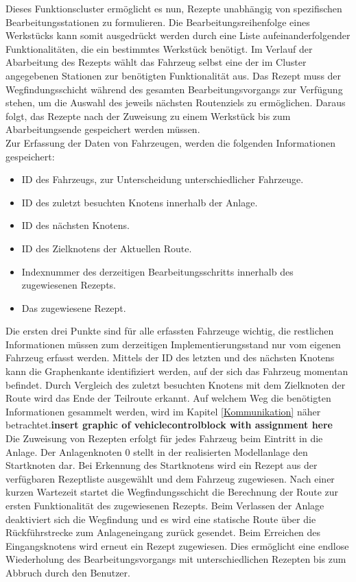 			Dieses Funktionscluster ermöglicht es nun, Rezepte unabhängig von spezifischen Bearbeitungsstationen zu formulieren. Die Bearbeitungsreihenfolge eines Werkstücks kann somit ausgedrückt werden durch eine Liste aufeinanderfolgender Funktionalitäten, die ein bestimmtes Werkstück benötigt. Im Verlauf der Abarbeitung des Rezepts wählt das Fahrzeug selbst eine der im Cluster angegebenen Stationen zur benötigten Funktionalität aus. Das Rezept muss der Wegfindungsschicht während des gesamten Bearbeitungsvorgangs zur Verfügung stehen, um die Auswahl des jeweils nächsten Routenziels zu ermöglichen. Daraus folgt, das Rezepte nach der Zuweisung zu einem Werkstück bis zum Abarbeitungsende gespeichert werden müssen.\\
			
			Zur Erfassung der Daten von Fahrzeugen, werden die folgenden Informationen gespeichert:
			
			\begin{itemize}
				\item ID des Fahrzeugs, zur Unterscheidung unterschiedlicher Fahrzeuge.
				\item ID des zuletzt besuchten Knotens innerhalb der Anlage.
				\item ID des nächsten Knotens. 
				\item ID des Zielknotens der Aktuellen Route.
				\item Indexnummer des derzeitigen Bearbeitungsschritts innerhalb des zugewiesenen Rezepts.
				\item Das zugewiesene Rezept.
			\end{itemize} 
			
			Die ersten drei Punkte sind für alle erfassten Fahrzeuge wichtig, die restlichen Informationen müssen zum derzeitigen Implementierungsstand nur vom eigenen Fahrzeug erfasst werden. Mittels der ID des letzten und des nächsten Knotens kann die Graphenkante identifiziert werden, auf der sich das Fahrzeug momentan befindet. Durch Vergleich des zuletzt besuchten Knotens mit dem Zielknoten der Route wird das Ende der Teilroute erkannt. Auf welchem Weg die benötigten Informationen gesammelt werden, wird im  Kapitel \ref{Kommunikation} näher betrachtet.\textbf{insert graphic of vehiclecontrolblock with assignment here}\\
			
			Die Zuweisung von Rezepten erfolgt für jedes Fahrzeug beim Eintritt in die Anlage. Der Anlagenknoten 0 stellt in der realisierten Modellanlage den Startknoten dar. Bei Erkennung des Startknotens wird ein Rezept aus der verfügbaren Rezeptliste ausgewählt und dem Fahrzeug zugewiesen. Nach einer kurzen Wartezeit startet die Wegfindungsschicht die Berechnung der Route zur ersten Funktionalität des zugewiesenen Rezepts. Beim Verlassen der Anlage deaktiviert sich die Wegfindung und es wird eine statische Route über die Rückführstrecke zum Anlageneingang zurück gesendet. Beim Erreichen des Eingangsknotens wird erneut ein Rezept zugewiesen. Dies ermöglicht eine endlose Wiederholung des Bearbeitungsvorgangs  mit unterschiedlichen Rezepten bis zum Abbruch durch den Benutzer.\\
			
